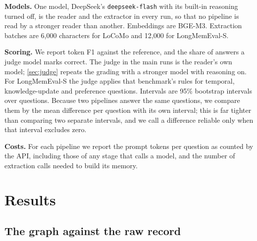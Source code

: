 \documentclass[11pt,letterpaper]{article}
\begin{document}
\textbf{Models.} One model, DeepSeek's \texttt{deepseek-flash} with its built-in reasoning turned off, is the reader and the extractor in every run, so that no pipeline is read by a stronger reader than another. Embeddings are BGE-M3. Extraction batches are 6,000 characters for LoCoMo and 12,000 for LongMemEval-S.

\textbf{Scoring.} We report token F1 against the reference, and the share of answers a judge model marks correct. The judge in the main runs is the reader's own model; \cref{sec:judge} repeats the grading with a stronger model with reasoning on. For LongMemEval-S the judge applies that benchmark's rules for temporal, knowledge-update and preference questions. Intervals are 95\% bootstrap intervals over questions. Because two pipelines answer the same questions, we compare them by the mean difference per question with its own interval; this is far tighter than comparing two separate intervals, and we call a difference reliable only when that interval excludes zero.

\textbf{Costs.} For each pipeline we report the prompt tokens per question as counted by the API, including those of any stage that calls a model, and the number of extraction calls needed to build its memory.

\section{Results}
\label{sec:results}

\subsection{The graph against the raw record}

\begin{table}[ht]
\centering
\caption{LoCoMo, all \numLocomoQuestions\ questions. F1 and judged accuracy with 95\% intervals; judged accuracy on the \numLocomoAnswerable\ answerable questions; share of questions for which a turn containing the answer was in the context; prompt tokens per question; extraction calls per conversation.}
\label{tab:locomo}
\small

\end{table}

\begin{table}[ht]
\centering
\caption{LongMemEval-S, \numLmeQuestions\ questions. Columns as in \cref{tab:locomo}; calls are per history.}
\label{tab:lme}
\small

\end{table}
\end{document}
